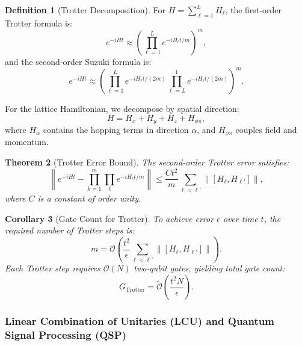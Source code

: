 \documentclass[11pt,a4paper]{article}
\newcommand{\Order}{\mathcal{O}}
\newcommand{\Otilde}{\widetilde{\mathcal{O}}}
\theoremstyle{plain}
\newtheorem{theorem}{Theorem}[section]
\newtheorem{corollary}[theorem]{Corollary}
\theoremstyle{definition}
\newtheorem{definition}[theorem]{Definition}
\theoremstyle{remark}
\begin{document}
\begin{definition}[Trotter Decomposition]
For $H = \sum_{\ell=1}^L H_\ell$, the first-order Trotter formula is:
\begin{equation}\label{eq:trotter_first}
    e^{-iHt} \approx \left(\prod_{\ell=1}^L e^{-iH_\ell t/m}\right)^m,
\end{equation}
and the second-order Suzuki formula is:
\begin{equation}\label{eq:suzuki_second}
    e^{-iHt} \approx \left(\prod_{\ell=1}^L e^{-iH_\ell t/(2m)} \prod_{\ell=L}^1 e^{-iH_\ell t/(2m)}\right)^m.
\end{equation}
\end{definition}

For the lattice Hamiltonian, we decompose by spatial direction:
\begin{equation}
    H = H_x + H_y + H_z + H_{\phi\pi},
\end{equation}
where $H_\alpha$ contains the hopping terms in direction $\alpha$, and $H_{\phi\pi}$ couples field and momentum.

\begin{theorem}[Trotter Error Bound]\label{thm:trotter_error}
The second-order Trotter error satisfies:
\begin{equation}\label{eq:trotter_error_bound}
    \left\| e^{-iHt} - \prod_{k=1}^{m} \prod_{\ell} e^{-iH_\ell t/m} \right\| \leq \frac{C t^2}{m} \sum_{\ell<\ell'} \|[H_\ell, H_{\ell'}]\|,
\end{equation}
where $C$ is a constant of order unity.
\end{theorem}

\begin{corollary}[Gate Count for Trotter]
To achieve error $\epsilon$ over time $t$, the required number of Trotter steps is:
\begin{equation}
    m = \Order\left(\frac{t^2}{\epsilon} \sum_{\ell<\ell'} \|[H_\ell, H_{\ell'}]\|\right).
\end{equation}
Each Trotter step requires $\Order(N)$ two-qubit gates, yielding total gate count:
\begin{equation}\label{eq:trotter_gates}
    G_{\text{Trotter}} = \Otilde\left(\frac{t^2 N}{\epsilon}\right).
\end{equation}
\end{corollary}

\subsubsection{Linear Combination of Unitaries (LCU) and Quantum Signal Processing (QSP)}
\end{document}
